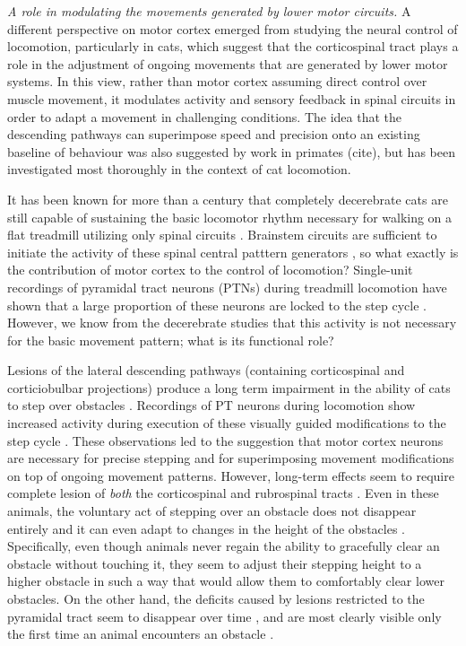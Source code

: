 \emph{A role in modulating the movements generated by lower motor circuits.}
A different perspective on motor cortex emerged from studying the neural control of locomotion, particularly in cats, which suggest that the corticospinal tract plays a role in the adjustment of ongoing movements that are generated by lower motor systems. In this view, rather than motor cortex assuming direct control over muscle movement, it modulates activity and sensory feedback in spinal circuits in order to adapt a movement in challenging conditions. The idea that the descending pathways can superimpose speed and precision onto an existing baseline of behaviour was also suggested by work in primates (cite), but has been investigated most thoroughly in the context of cat locomotion. 

It has been known for more than a century that completely decerebrate cats are still capable of sustaining the basic locomotor rhythm necessary for walking on a flat treadmill utilizing only spinal circuits \cite{GrahamBrown1911}. Brainstem circuits are sufficient to initiate the activity of these spinal central patttern generators \cite{Grillner1973}, so what exactly is the contribution of motor cortex to the control of locomotion? Single-unit recordings of pyramidal tract neurons (PTNs) during treadmill locomotion have shown that a large proportion of these neurons are locked to the step cycle \cite{Armstrong1984a}. However, we know from the decerebrate studies that this activity is not necessary for the basic movement pattern; what is its functional role?

Lesions of the lateral descending pathways (containing corticospinal and corticiobulbar projections) produce a long term impairment in the ability of cats to step over obstacles \cite{Drew2002}. Recordings of PT neurons during locomotion show increased activity during execution of these visually guided modifications to the step cycle \cite{Drew1996}. These observations led to the suggestion that motor cortex neurons are necessary for precise stepping and for superimposing movement modifications on top of ongoing movement patterns. However, long-term effects seem to require complete lesion of \emph{both} the corticospinal and rubrospinal tracts \cite{Drew2002}. Even in these animals, the voluntary act of stepping over an obstacle does not disappear entirely and it can even adapt to changes in the height of the obstacles \cite{Drew2002}. Specifically, even though animals never regain the ability to gracefully clear an obstacle without touching it, they seem to adjust their stepping height to a higher obstacle in such a way that would allow them to comfortably clear lower obstacles. On the other hand, the deficits caused by lesions restricted to the pyramidal tract seem to disappear over time \cite{Liddell1944}, and are most clearly visible only the first time an animal encounters an obstacle \cite{Liddell1944}.

